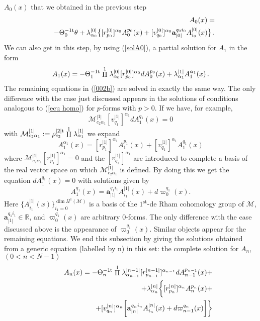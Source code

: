 \documentclass[prd,a4paper,twocolumn,amssymb,amsmath,nofootinbib,showpacs]{revtex4}
\begin{document}
$A_0(x)$ that we obtained in the previous step
\begin{eqnarray}
&&\hspace{-.5cm}A_0(x)=\label{solA0}\\
&&-\Theta_0^{-1\rm{t}}\theta+\lambda_{\alpha_0}^{|0|}\big\{
[r^{|0|}_{p_0}]^{\alpha_0}A_0^{p_0}(x)+ [v^{|0|}_{q_0}]^{\alpha_0}
\mathbf{a}_{|0|}^{q_0i_0}A_{i_0}^{|0|}(x)\big\}\,.\nonumber
\end{eqnarray}
We can also get in this step, by using (\ref{solA0}), a partial
solution for $A_1$ in the form
\begin{equation}
A_1(x)=-\Theta_1^{-1\rm{t}}\stackrel{1}{\Pi}
\lambda_{\alpha_0}^{|0|}[r^{|0|}_{p_0}]^{\alpha_0}dA_0^{p_0}(x)+
\lambda_{\alpha_1}^{|1|}A_1^{\alpha_1}(x)\,.\label{solparA1}
\end{equation}
The remaining equations in (\ref{002b}) are solved in exactly the
same way. The only difference with the case just discussed appears
in the solutions of conditions analogous to (\ref{ecu homo}) for
$p$-forms with $p>0$. If we have, for example,
$$
\mathcal{M}_{c_2\alpha_1}^{|1|}[v^{|1|}_{q_1}]^{\alpha_1}
dA_1^{q_1}(x)=0
$$
with $\mathcal{M}_{c_2\alpha_1}^{|1|}:=
\rho_{c_2}^{|2|\rm{t}}\stackrel{1}{\Pi}\lambda_{\alpha_1}^{|1|}$
we expand
$$
A_1^{\alpha_1}(x)=[r^{|1|}_{p_1}]^{\alpha_1}A_1^{p_1}(x)+
[v^{|1|}_{q_1}]^{\alpha_1} A_1^{q_1}(x)
$$
where
$\mathcal{M}_{c_2\alpha_1}^{|1|}[r^{|1|}_{p_1}]^{\alpha_1}=0$ and
the $[v^{|1|}_{q_1}]^{\alpha_1}$ are introduced to complete a
basis of the real vector space on which
$\mathcal{M}_{c_2\alpha_1}^{|1|}$ is defined. By doing this we get
the equation $dA_1^{q_1}(x)=0$ with solutions given by
\begin{equation}
A_1^{q_1}(x)=\mathbf{a}_{|1|}^{q_1i_1}A_{i_1}^{|1|}(x)+d\varpi_0^{q_1}(x).
\label{solA1q}
\end{equation}
Here  $\{A_{i_1}^{|1|}(x)\}_{i_1=0}^{\dim H^1(\mathcal{M})}$ is a
basis of the $1^{\textrm{st}}$-de Rham cohomology group of
$\mathcal{M}$, $\mathbf{a}_{|1|}^{q_1i_1}\in\mathbb{R}$, and
$\varpi_0^{q_1}(x)$ are arbitrary 0-forms. The only difference
with the case discussed above is the appearance of
$\varpi_0^{q_1}(x)$. Similar objects appear for the remaining
equations. We end this subsection by giving the solutions obtained
from a generic equation (labelled by n) in this set: the complete
solution for $A_n$, $(0<n<N-1)$
\begin{eqnarray}
&&\hspace{-.5cm}A_n(x)=-\Theta_n^{-1\rm{t}}\stackrel{1}{\Pi}
\lambda_{\alpha_{n-1}}^{|n-1|}[r^{|n-1|}_{p_{n-1}}]^{\alpha_{n-1}}
dA_{n-1}^{p_{n-1}}(x)+\nonumber\\
&&\hspace{-.5cm}+\lambda_{\alpha_n}^{|n|}
\bigg\{[r^{|n|}_{p_n}]^{\alpha_n}A^{p_n}_n(x)+
\label{CompSolAn}\\
&&\hspace{2cm}+[v^{|n|}_{q_n}]^{\alpha_n}
\bigg[\mathbf{a}_{|n|}^{q_ni_n}A^{|n|}_{i_n}(x)+
d\varpi_{n-1}^{q_n}(x)\bigg]\bigg\}\nonumber
\end{eqnarray}
\end{document}
